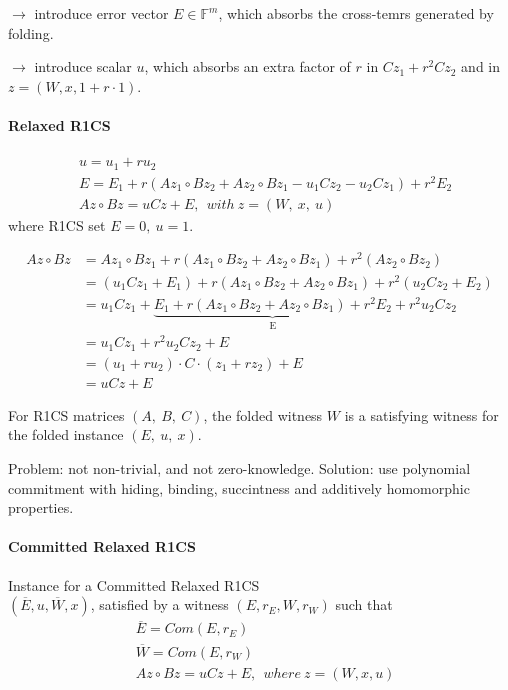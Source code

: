 \documentclass{article}
\theoremstyle{definition}
\begin{document}
$\longrightarrow$ introduce error vector $E \in \mathbb{F}^m$, which absorbs the cross-temrs generated by folding.

$\longrightarrow$ introduce scalar $u$, which absorbs an extra factor of $r$ in $C z_1 + r^2 C z_2$ and in $z=(W, x, 1+r\cdot 1)$.

\paragraph{Relaxed R1CS}
\begin{align*}
	&u=u_1+r u_2\\
	&E=E_1 + r (A z_1 \circ B z_2 + A z_2 \circ B z_1 - u_1 C z_2 - u_2 C z_1) + r^2 E_2\\
	&Az \circ Bz = uCz + E,~~ with~ z=(W,~x,~u)
\end{align*}
where R1CS set $E=0,~u=1$.

\begin{align*}
	Az \circ Bz &= A z_1 \circ B z_1 + r(A z_1 \circ B z_2 + A z_2 \circ B z_1) + r^2 (A z_2 \circ B z_2)\\
		    &= (u_1 C z_1 + E_1) + r (A z_1 \circ B z_2 + A z_2 \circ B z_1) + r^2 (u_2 C z_2 + E_2)\\
		    &= u_1 C z_1 + \underbrace{E_1 + r(A z_1 \circ B z_2 + A z_2 \circ B z_1) + r^2 E_2}_\text{E} + r^2 u_2 C z_2\\
		    &= u_1 C z_1 + r^2 u_2 C z_2 + E\\
		    &= (u_1 + r u_2) \cdot C \cdot (z_1 + r z_2) + E\\
		    &= uCz + E
\end{align*}

For R1CS matrices $(A,~B,~C)$, the folded witness $W$ is a satisfying witness for the folded instance $(E,~u,~x)$.



\vspace{20px}
Problem: not non-trivial, and not zero-knowledge. Solution: use polynomial commitment with hiding, binding, succintness and additively homomorphic properties.

\paragraph{Committed Relaxed R1CS}
Instance for a Committed Relaxed R1CS\\
$(\overline{E}, u, \overline{W}, x)$, satisfied by a witness $(E, r_E, W, r_W)$ such that
\begin{align*}
	&\overline{E} = Com(E, r_E)\\
	&\overline{W} = Com(E, r_W)\\
	&Az \circ Bz = uCz+E,~~ where~z=(W, x, u)
\end{align*}
\end{document}
